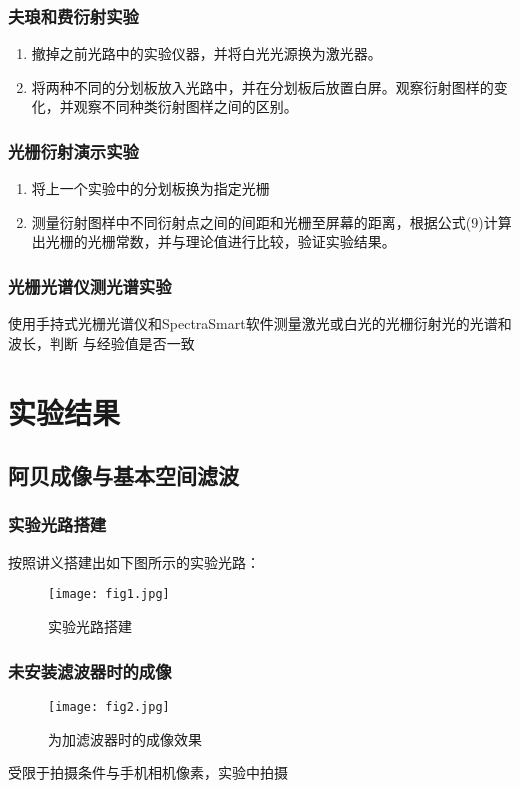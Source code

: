 \documentclass[UTF-8,twoside,cs4size]{ctexart}
\begin{document}
\subsubsection{夫琅和费衍射实验}
\begin{enumerate}
    \item 撤掉之前光路中的实验仪器，并将白光光源换为激光器。
    
    \item 将两种不同的分划板放入光路中，并在分划板后放置白屏。观察衍射图样的变化，并观察不同种类衍射图样之间的区别。
\end{enumerate}
\subsubsection{光栅衍射演示实验}
\begin{enumerate}
    \item 将上一个实验中的分划板换为指定光栅
    
    \item 测量衍射图样中不同衍射点之间的间距和光栅至屏幕的距离，根据公式(9)计算出光栅的光栅常数，并与理论值进行比较，验证实验结果。
\end{enumerate}
\subsubsection{光栅光谱仪测光谱实验}
使用手持式光栅光谱仪和SpectraSmart软件测量激光或白光的光栅衍射光的光谱和波长，判断
与经验值是否一致


\section{实验结果}
\subsection{阿贝成像与基本空间滤波}
\subsubsection{实验光路搭建}
按照讲义搭建出如下图所示的实验光路：
\begin{figure}[!h]
    \centering
    \texttt{[image: fig1.jpg]}
    \caption{实验光路搭建}
\end{figure}  

\subsubsection{未安装滤波器时的成像}
\begin{figure}[!h]
    \centering
    \texttt{[image: fig2.jpg]}
    \caption{为加滤波器时的成像效果}
\end{figure} 
\newpage
受限于拍摄条件与手机相机像素，实验中拍摄
\end{document}
